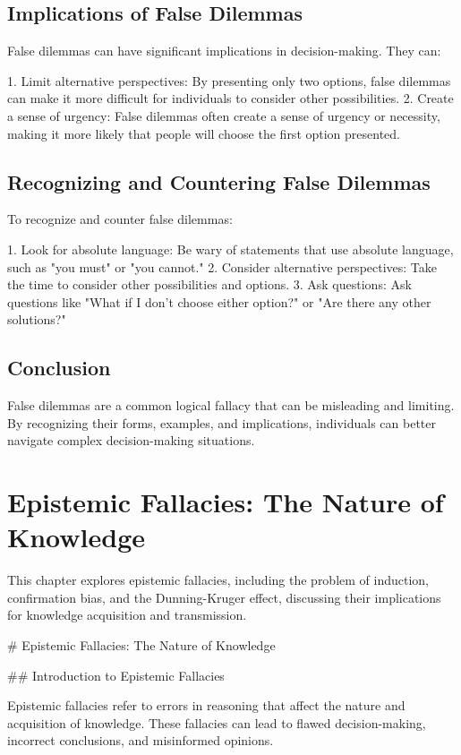 \documentclass{report}%
\begin{document}
{{{{{{{{{{{{{{\section{Implications of False Dilemmas}

False dilemmas can have significant implications in decision-making. They can:

1. Limit alternative perspectives: By presenting only two options, false dilemmas can make it more difficult for individuals to consider other possibilities.
2. Create a sense of urgency: False dilemmas often create a sense of urgency or necessity, making it more likely that people will choose the first option presented.

\section{Recognizing and Countering False Dilemmas}

To recognize and counter false dilemmas:

1. Look for absolute language: Be wary of statements that use absolute language, such as "you must" or "you cannot."
2. Consider alternative perspectives: Take the time to consider other possibilities and options.
3. Ask questions: Ask questions like "What if I don't choose either option?" or "Are there any other solutions?"

\section{Conclusion}

False dilemmas are a common logical fallacy that can be misleading and limiting. By recognizing their forms, examples, and implications, individuals can better navigate complex decision-making situations.%
\chapter{Epistemic Fallacies: The Nature of Knowledge}%
This chapter explores epistemic fallacies, including the problem of induction, confirmation bias, and the Dunning-Kruger effect, discussing their implications for knowledge acquisition and transmission.

%
# Epistemic Fallacies: The Nature of Knowledge

## Introduction to Epistemic Fallacies

Epistemic fallacies refer to errors in reasoning that affect the nature and acquisition of knowledge. These fallacies can lead to flawed decision-making, incorrect conclusions, and misinformed opinions.

}}}}}}}}}}}}}}
\end{document}
